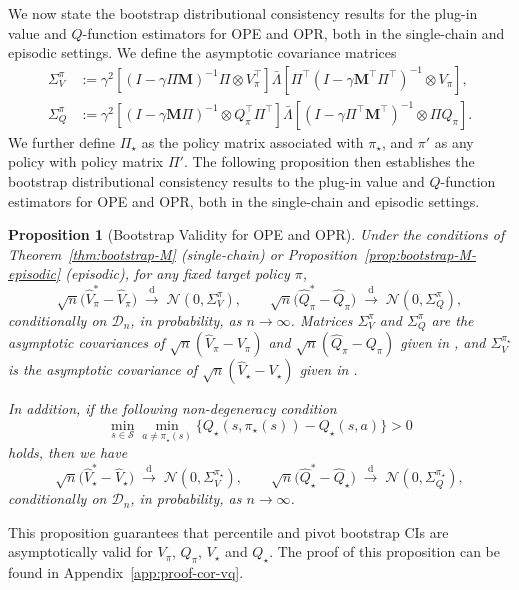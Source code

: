 \documentclass{article}
\numberwithin{equation}{section}
\newtheorem{proposition}[lemma]{Proposition}
\begin{document}
We now state the bootstrap distributional consistency results for the plug-in value and $Q$-function estimators for OPE and OPR, both in the single-chain and episodic settings.
We define the asymptotic covariance matrices
\begin{align*}
\Sigma_V^\pi &:= \gamma^2\!\left[(I-\gamma\Pi\mathbf{M})^{-1}\Pi\otimes V_\pi^\top\right]\!\bar\Lambda\!\left[\Pi^\top(I-\gamma\mathbf{M}^\top\Pi^\top)^{-1}\otimes V_\pi\right],\\[0.4em]
\Sigma_Q^\pi &:= \gamma^2\!\left[(I-\gamma\mathbf{M}\Pi)^{-1}\otimes Q_\pi^\top\Pi^\top\right]\!\bar\Lambda\!\left[(I-\gamma\Pi^\top\mathbf{M}^\top)^{-1}\otimes \Pi Q_\pi\right].
\end{align*}
We further define $\Pi_\star$ as the policy matrix associated with $\pi_\star$, and $\pi'$ as any policy with policy matrix $\Pi'$.
The following proposition then establishes the bootstrap distributional consistency results to the plug-in value and $Q$-function estimators for OPE and OPR, both in the single-chain and episodic settings.
\begin{proposition}[Bootstrap Validity for OPE and OPR]
\label{prop:bootstrap-vq}
Under the conditions of Theorem~\ref{thm:bootstrap-M} (single-chain) or Proposition~\ref{prop:bootstrap-M-episodic} (episodic), for any fixed target policy $\pi$,
\[
\sqrt{n}\bigl(\hat V_\pi^\ast - \hat V_\pi\bigr) \;\xrightarrow{\mathrm{d}}\; \mathcal{N}(0,\Sigma_V^\pi),
\qquad
\sqrt{n}\bigl(\hat Q_\pi^\ast - \hat Q_\pi\bigr) \;\xrightarrow{\mathrm{d}}\; \mathcal{N}(0,\Sigma_Q^\pi),
\]
conditionally on $\mathcal{D}_n$, in probability, as $n\to\infty$.
Matrices $\Sigma_V^\pi$ and $\Sigma_Q^\pi$ are the asymptotic covariances of $\sqrt{n}(\hat V_\pi - V_\pi)$ and $\sqrt{n}(\hat Q_\pi - Q_\pi)$ given in \citet[Theorem~2]{su2025centrallimittheoremstransition}, and $\Sigma_V^{\pi_\star}$ is the asymptotic covariance of $\sqrt{n}(\hat V_\star - V_\star)$ given in \citet[Theorem~3]{su2025centrallimittheoremstransition}.

In addition, if the following non-degeneracy condition
\[
\min_{s\in\mathcal{S}} \min_{a \neq \pi_\star(s)}\bigl\{Q_\star(s, \pi_\star(s))-Q_\star(s,a)\bigr\}>0
\]
holds, then we have
\[
\sqrt{n}\bigl(\hat V_\star^\ast - \hat V_\star\bigr) \;\xrightarrow{\mathrm{d}}\; \mathcal{N}(0,\Sigma_V^{\pi_\star}), 
\qquad 
\sqrt{n}\bigl(\hat Q_\star^\ast - \hat Q_\star\bigr) \;\xrightarrow{\mathrm{d}}\; \mathcal{N}(0,\Sigma_Q^{\pi_\star}),
\]
conditionally on $\mathcal{D}_n$, in probability, as $n\to\infty$.
\end{proposition}
This proposition guarantees that percentile and pivot bootstrap CIs are asymptotically valid for $V_\pi$, $Q_\pi$, $V_\star$ and $Q_\star$.
The proof of this proposition can be found in Appendix~\ref{app:proof-cor-vq}.
\end{document}
